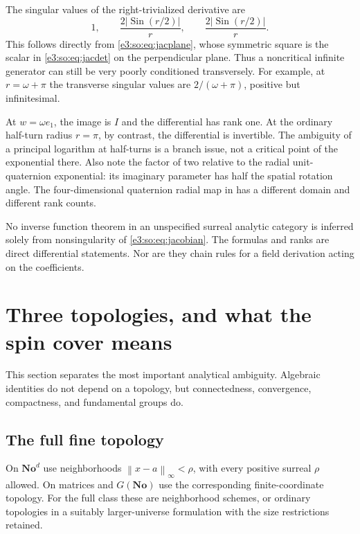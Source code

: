 \documentclass[11pt,letterpaper]{article}
\numberwithin{equation}{section}
\theoremstyle{definition}
\theoremstyle{remark}
\newcommand{\No}{\mathbf{No}}
\newcommand{\Sin}{\operatorname{Sin}}
\newcommand{\norm}[1]{\left\lVert#1\right\rVert}
\newcommand{\abs}[1]{\left|#1\right|}
\begin{document}
The singular values of the right-trivialized derivative are
\begin{equation}\label{e3:so:eq:singularvalues}
 1,\qquad \frac{2\abs{\Sin(r/2)}}r,\qquad
          \frac{2\abs{\Sin(r/2)}}r.
\end{equation}
This follows directly from \cref{e3:so:eq:jacplane}, whose symmetric square is the
scalar in \cref{e3:so:eq:jacdet} on the perpendicular plane. Thus a noncritical
infinite generator can still be very poorly conditioned transversely. For
example, at \(r=\omega+\pi\) the transverse singular values are
\(2/(\omega+\pi)\), positive but infinitesimal.

At \(w=\omega e_1\), the image is \(I\) and the differential has rank one.
At the ordinary half-turn radius \(r=\pi\), by contrast, the differential is
invertible. The ambiguity of a principal logarithm at half-turns is a branch
issue, not a critical point of the exponential there. Also note the factor of
two relative to the radial unit-quaternion exponential: its imaginary parameter
has half the spatial rotation angle. The four-dimensional quaternion radial map
in \cite{RepoQuaternion} has a different domain and different rank counts.

No inverse function theorem in an unspecified surreal analytic category is
inferred solely from nonsingularity of \cref{e3:so:eq:jacobian}. The formulas and
ranks are direct differential statements. Nor are they chain rules for a
field derivation acting on the coefficients.

\section{Three topologies, and what the spin cover means}\label{e3:so:sec:topology}

This section separates the most important analytical ambiguity. Algebraic
identities do not depend on a topology, but connectedness, convergence, compactness,
and fundamental groups do.

\subsection{The full fine topology}

On \(\No^d\) use neighborhoods
\(\norm{x-a}_{\infty}<\rho\), with every positive surreal \(\rho\) allowed.
On matrices and \(G(\No)\) use the corresponding finite-coordinate topology.
For the full class these are neighborhood schemes, or ordinary topologies in a
suitably larger-universe formulation with the size restrictions retained.
\end{document}
